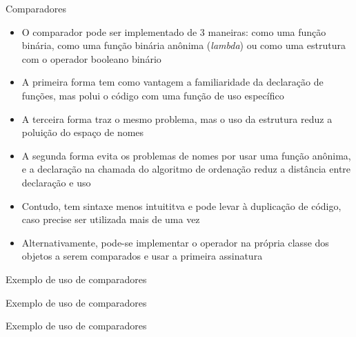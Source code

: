\begin{frame}[fragile]{Comparadores}

    \begin{itemize}
        \item O comparador pode ser implementado de 3 maneiras: como uma função binária,
            como uma função binária anônima (\textit{lambda}) ou como uma estrutura com
            o operador booleano binário 

        \item A primeira forma tem como vantagem a familiaridade da declaração de funções,
            mas polui o código com uma função de uso específico

        \item A terceira forma traz o mesmo problema, mas o uso da estrutura 
            reduz a poluição do espaço de nomes

        \item A segunda forma evita os problemas de nomes por usar uma função anônima, e a
            declaração na chamada do algoritmo de ordenação reduz a distância entre declaração e uso

        \item Contudo, tem sintaxe menos intuititva e pode levar à duplicação de código, caso
            precise ser utilizada mais de uma vez
        
        \item Alternativamente, pode-se implementar o operador  na própria 
            classe dos objetos a serem comparados e usar a primeira assinatura
    \end{itemize}

\end{frame}

\begin{frame}[fragile]{Exemplo de uso de comparadores}
\end{frame}

\begin{frame}[fragile]{Exemplo de uso de comparadores}
\end{frame}

\begin{frame}[fragile]{Exemplo de uso de comparadores}
\end{frame}

